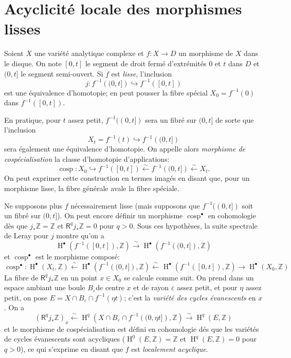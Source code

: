 \documentclass{book}
\DeclareMathOperator{\cosp}{cosp}
\DeclareMathOperator{\h}{H}
\newcommand{\dZ}{\mathbb{Z}}
\newcommand{\iso}{\xrightarrow\sim}
\newcommand{\R}{\mathsf{R}}
\begin{document}
\section{Acyclicité locale des morphismes lisses}\label{I:5}

Soient $X$ une variété analytique complexe et $f:X\to D$ un morphisme de 
$X$ dans le disque. On note $[0,t]$ le segment de droit fermé d'extrémités 
$0$ et $t$ dans $D$ et $(0,t]$ le segment semi-ouvert. Si $f$ est \emph{lisse}, 
l'inclusion 
\[
  j : f^{-1}\left((0,t]\right) \hookrightarrow f^{-1}\left([0,t]\right)
\]
est une équivalence d'homotopie; en peut pousser la fibre spécial 
$X_0=f^{-1}(0)$ dans $f^{-1}([0,t])$. 

En pratique, pour $t$ assez petit, $f^{-1}((0,t])$ sera un fibré sur 
$(0,t]$ de sorte que l'inclusion 
\[
  X_t = f^{-1}(t) \hookrightarrow f^{-1}\left((0,t]\right)
\]
sera également une équivalence d'homotopie. On appelle alors \emph{morphisme 
de cospécialisation} la classe d'homotopie d'applications: 
\[
  \cosp : X_0 \hookrightarrow f^{-1}\left([0,t]\right) \xleftarrow\sim f^{-1}\left((0,t]\right) \xleftarrow\sim X_t \text{.}
\]
On peut exprimer cette construction en termes imagés en disant que, pour un 
morphisme lisse, la fibre générale avale la fibre spéciale. 

Ne supposons plus $f$ nécessairement lisse (mais supposons que $f^{-1}((0,t])$ 
soit un fibré sur $(0,t]$). On peut encore définir un morphisme 
$\cosp^\bullet$ en cohomologie dès que $j_* \dZ=\dZ$ et 
$\R^q j_* \dZ = 0$ pour $q>0$. Sous ces hypothèses, la suite spectrale de 
Leray pour $j$ montre qu'on a 
\[
  \h^\bullet\left(f^{-1}\left([0,t]\right),\dZ\right) \iso \h^\bullet\left(f^{-1}\left((0,t]\right),\dZ\right)
\]
et $\cosp^\bullet$ est le morphisme composé: 
\[
  \cosp^\bullet : \h^\bullet(X_t,\dZ)
    \xleftarrow\sim \h^\bullet\left(f^{-1}\left((0,t]\right),\dZ\right) 
    \xleftarrow\sim \h^\bullet\left(f^{-1}\left([0,t]\right),\dZ\right) 
    \to \h^\bullet(X_0,\dZ)
\]
La fibre de $\R^q j_* \dZ$ en un point $x\in X_0$ se calcule comme suit. On 
prend dans un espace ambiant une boule $B_\varepsilon$de centre $x$ et de rayon 
$\varepsilon$ assez petit, et pour $\eta$ assez petit, on pose 
$E=X\cap B_\varepsilon \cap f^{-1}(\eta t)$; c'est la \emph{variété des 
cycles évanescents} en $x$. On a 
\[
  (\R^q j_* \dZ)_x \xleftarrow\sim \h^q\left(X\cap B_\varepsilon\cap f^{-1}\left((0,\eta t]\right),\dZ\right) \xrightarrow\sim \h^q(E,\dZ)
\]
et le morphisme de cospécialisation est défini en cohomologie dés que les 
variétés de cycles évanescents sont acycliques ($\h^0(E,\dZ)=\dZ$ et 
$\h^q(E,\dZ) = 0$ pour $q>0$), ce qui s'exprime en disant que $f$ est 
\emph{localement acyclique}. 
\end{document}
